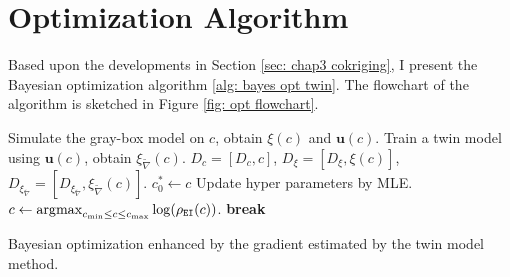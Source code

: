 \section{Optimization Algorithm}
\label{sec: chap3 algo}
Based upon the
developments in Section \ref{sec: chap3 cokriging}, I present 
the Bayesian optimization algorithm \ref{alg: bayes opt twin}. The
flowchart of the algorithm is sketched in Figure \ref{fig: opt flowchart}. \\

\begin{algorithm}[htbp]
\begin{algorithmic}[1]
    \STATE Simulate the gray-box model on $c$, obtain $\xi(c)$ and $\boldsymbol{u}(c)$.
    \STATE Train a twin model using $\boldsymbol{u}(c)$, obtain $\xi_{\tilde{\nabla}}(c)$.
    \STATE $D_c = [D_c, c]$, $D_{\xi} = [D_\xi, \xi(c)]$, $D_{\xi_{\tilde{\nabla}}} = 
           [D_{\xi_{\tilde{\nabla}}}, \xi_{\tilde{\nabla}}(c)]$.
        \STATE $c^*_0 \leftarrow c$
    \ENDIF
    \STATE Update hyper parameters by MLE.
    \STATE $c \leftarrow \operatorname*{\arg\!\max}_{c_{\min}\le c\le c_{\max}} \log(\rho_{\texttt{EI}}(c))$.
        \STATE \textbf{break}
    \ENDIF
\ENDFOR
{}
\end{algorithmic}
\caption{Bayesian optimization enhanced by the gradient estimated by the twin model method.}
\label{alg: bayes opt twin}
\end{algorithm}

